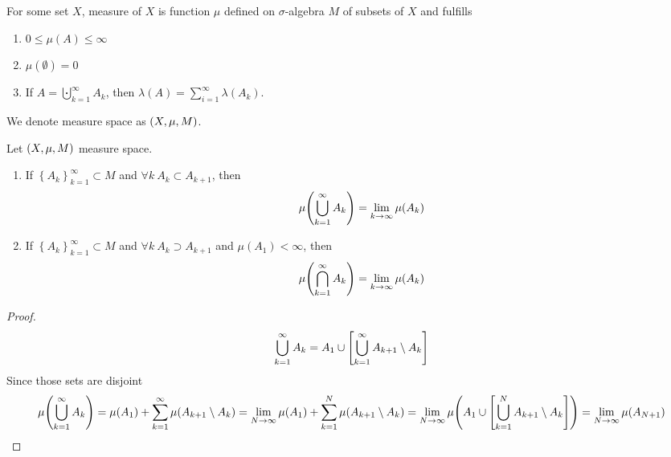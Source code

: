 \begin{definition}[Measure]
	For some set $X$, measure of $X$ is function $\mu$ defined on $\sigma$-algebra $M$ of subsets of $X$ and fulfills
	\begin{enumerate}
		\item $0\leq \mu(A) \leq \infty$
		\item $\mu(\emptyset) = 0$
		\item If $A = \bigcupdot_{k=1}^\infty A_k$, then $\lambda(A) = \sum_{i=1}^\infty \lambda(A_k)$.
	\end{enumerate}
\end{definition}
We denote measure space as $\qty(X,\mu, M)$.
\begin{theorem}
	Let  $\qty(X,\mu, M)$ measure space. 
	\begin{enumerate}
		\item If $\left\{ A_k \right\}_{k=1}^\infty \subset M$ and $\forall k \: A_k \subset A_{k+1}$, then
		$$\mu\qty(\bigcup_{k=1}^\infty A_k) = \lim_{k\to \infty} \mu(A_k)$$
		\item If $\left\{ A_k \right\}_{k=1}^\infty \subset M$ and $\forall k \: A_k \supset A_{k+1}$ and $\mu(A_1) < \infty$, then
		$$\mu\qty(\bigcap_{k=1}^\infty A_k) = \lim_{k\to \infty} \mu(A_k)$$
	\end{enumerate}

\begin{proof}
	$$\bigcup_{k=1}^\infty A_k = A_1 \cup \qty[\bigcup_{k=1}^\infty A_{k+1}\setminus A_k]$$
	Since those sets are disjoint
	$$\mu\qty(\bigcup_{k=1}^\infty A_k ) = \mu(A_1) + \sum_{k=1}^\infty \mu(A_{k+1} \setminus A_k)= \lim_{N\to \infty} \mu(A_1) + \sum_{k=1}^N \mu(A_{k+1} \setminus A_k) = \lim_{N\to \infty} \mu\qty(A_1 \cup \qty[\bigcup_{k=1}^N A_{k+1}\setminus A_k])  = \lim_{N\to \infty} \mu\qty(A_{N+1})$$
\end{proof}
\end{theorem}

